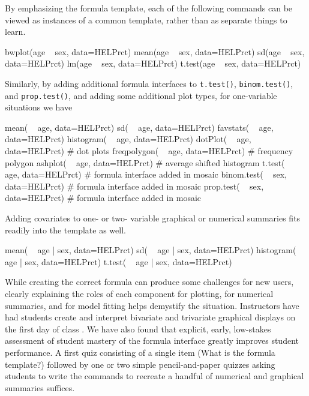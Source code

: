 By emphasizing the formula template, each of the following commands can
be viewed as instances of a common template, rather than as separate
things to learn.

\begin{Schunk}
\begin{Sinput}
bwplot(age ~ sex, data=HELPrct)
  mean(age ~ sex, data=HELPrct)
    sd(age ~ sex, data=HELPrct)
    lm(age ~ sex, data=HELPrct)
t.test(age ~ sex, data=HELPrct) 
\end{Sinput}
\end{Schunk}

\noindent
Similarly, by adding additional formula interfaces to \texttt{t.test()},
\texttt{binom.test()}, and \texttt{prop.test()}, and adding some
additional plot types, for one-variable situations we have

\begin{Schunk}
\begin{Sinput}
       mean( ~ age, data=HELPrct)
         sd( ~ age, data=HELPrct)
   favstats( ~ age, data=HELPrct)
  histogram( ~ age, data=HELPrct)
    dotPlot( ~ age, data=HELPrct)   # dot plots
freqpolygon( ~ age, data=HELPrct)   # frequency polygon
    ashplot( ~ age, data=HELPrct)   # average shifted histogram
     t.test( ~ age, data=HELPrct)   # formula interface added in mosaic
 binom.test( ~ sex, data=HELPrct)   # formula interface added in mosaic
  prop.test( ~ sex, data=HELPrct)   # formula interface added in mosaic
\end{Sinput}
\end{Schunk}

\noindent
Adding covariates to one- or two- variable graphical or numerical
summaries fits readily into the template as well.

\begin{Schunk}
\begin{Sinput}
     mean( ~ age | sex, data=HELPrct)
       sd( ~ age | sex, data=HELPrct)
histogram( ~ age | sex, data=HELPrct)
   t.test( ~ age | sex, data=HELPrct)
\end{Sinput}
\end{Schunk}

While creating the correct formula can produce some challenges for new
users, clearly explaining the roles of each component for plotting, for
numerical summaries, and for model fitting helps demystify the
situation. Instructors have had students create and interpret bivariate
and trivariate graphical displays on the first day of class
\citep{Wang:USCOTS:2015}. We have also found that explicit, early,
low-stakes assessment of student mastery of the formula interface
greatly improves student performance. A first quiz consisting of a
single item (What is the formula template?) followed by one or two
simple pencil-and-paper quizzes asking students to write the commands to
recreate a handful of numerical and graphical summaries suffices.


